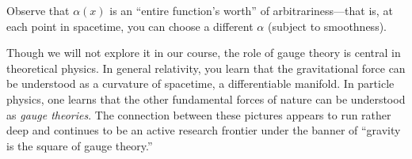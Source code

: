 \documentclass[12pt]{article}
\numberwithin{equation}{section}    %
\begin{document}
Observe that $\alpha(x)$ is an ``entire function's worth'' of arbitrariness---that is, at each point in spacetime, you can choose a different $\alpha$ (subject to smoothness).

Though we will not explore it in our course, the role of gauge theory is central in theoretical physics. In general relativity, you learn that the gravitational force can be understood as a curvature of spacetime, a differentiable manifold. In particle physics, one learns that the other fundamental forces of nature can be understood as \emph{gauge theories}. The connection between these pictures appears to run rather deep and continues to be an active research frontier under the banner of ``gravity is the square of gauge theory.''

%
%
\end{document}

